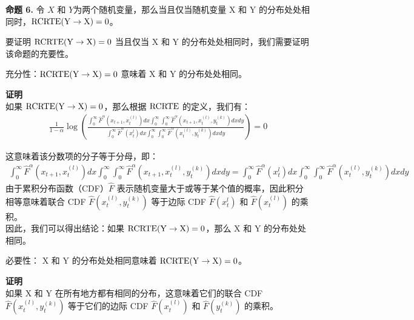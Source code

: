 \textbf{命题 6.} 令 $X$ 和 $Y$为两个随机变量，那么当且仅当随机变量 X 和 Y 的分布处处相同时，$\rm{RCRTE}(Y \rightarrow X) = 0$。

要证明 $\rm{RCRTE}(Y \rightarrow X) = 0$ 当且仅当 X 和 Y 的分布处处相同时，我们需要证明该命题的充要性。

充分性：$\rm{RCRTE}(Y \rightarrow X) = 0$ 意味着 X 和 Y 的分布处处相同。
	
\textbf{证明}\\

如果 $\rm{RCRTE}(Y\rightarrow X) = 0$，那么根据 $\rm{RCRTE}$ 的定义，我们有：
\begin{align*}
\frac{1}{1-\alpha} \log \left( \frac{\int_{0}^{\infty}\hat F^{\alpha}(x_{t+1},x_{t}^{(l)})dx \int_{0}^{\infty}\int_{0}^{\infty}\hat F^{\alpha}(x_{t+1},x_{t}^{(l)},y_{t}^{(k)})dxdy}{\int_{0}^{\infty}\hat F^{\alpha}(x_{t}^{l})dx \int_{0}^{\infty}\int_{0}^{\infty}\hat F^{\alpha}(x_{t}^{(l)},y_{t}^{(k)})dxdy} \right) = 0
\end{align*}

这意味着该分数项的分子等于分母，即：
\begin{align*}
\int_{0}^{\infty}\hat F^{\alpha}(x_{t+1},x_{t}^{(l)})dx \int_{0}^{\infty}\int_{0}^{\infty}\hat F^{\alpha}(x_{t+1},x_{t}^{(l)},y_{t}^{(k)})dxdy = \int_{0}^{\infty}\hat F^{\alpha}(x_{t}^{l})dx \int_{0}^{\infty}\int_{0}^{\infty}\hat F^{\alpha}(x_{t}^{(l)},y_{t}^{(k)})dxdy
\end{align*}
由于累积分布函数（CDF）$\hat F$ 表示随机变量大于或等于某个值的概率，因此积分相等意味着联合 CDF $\hat F(x_{t}^{(l)},y_{t}^{(k)})$ 等于边际 CDF $\hat F(x_{t}^{l})$ 和 $\hat F(x_{t}^{(l)})$ 的乘积。\\
因此，我们可以得出结论：如果 $\rm{RCRTE}(Y \rightarrow X) = 0$，那么 X 和 Y 的分布处处相同。


必要性： X 和 Y 的分布处处相同意味着 $\rm{RCRTE}(Y\rightarrow X) = 0$。

\textbf{证明}\\

如果 X 和 Y 在所有地方都有相同的分布，这意味着它们的联合 CDF $\hat F(x_{t}^{(l)},y_{t}^{(k)})$ 等于它们的边际 CDF $\hat F(x_{t}^{(l)})$ 和 $\hat F(y_{t}^{(k)})$ 的乘积。

